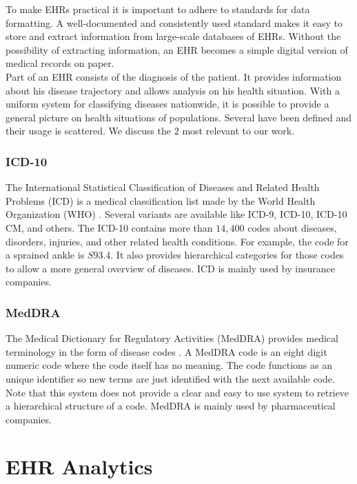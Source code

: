 To make EHRs practical it is important to adhere to standards for data formatting. A well-documented and consistently used standard makes it easy to store and extract information from large-scale databases of EHRs. Without the possibility of extracting information, an EHR becomes a simple digital version of medical records on paper. \\
Part of an EHR consists of the diagnosis of the patient. It provides information about his disease trajectory and allows analysis on his health situation. With a uniform system for classifying diseases nationwide, it is possible to provide a general picture on health situations of populations. Several have been defined and their usage is scattered. We discuss the $2$ most relevant to our work.

\subsubsection{ICD-10}

The International Statistical Classification of Diseases and Related Health Problems (ICD) is a medical classification list made by the World Health Organization (WHO) \cite{WHO_ICD:online}. Several variants are available like ICD-9, ICD-10, ICD-10 CM, and others. The ICD-10 contains more than $14,400$ codes about diseases, disorders, injuries, and other related health conditions. For example, the code for a sprained ankle is $S93.4$. It also provides hierarchical categories for those codes to allow a more general overview of diseases. ICD is mainly used by insurance companies.


\subsubsection{MedDRA}

The Medical Dictionary for Regulatory Activities (MedDRA) provides medical terminology in the form of disease codes \cite{MedDRA:online}. A MedDRA code is an eight digit numeric code where the code itself has no meaning. The code functions as an unique identifier so new terms are just identified with the next available code. Note that this system does not provide a clear and easy to use system to retrieve a hierarchical structure of a code. MedDRA is mainly used by pharmaceutical companies.

\section{EHR Analytics}
\label{sec:ehra}

